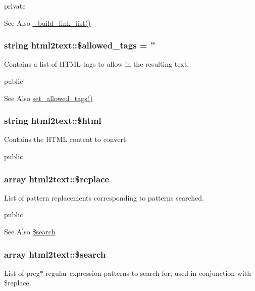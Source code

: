 private \begin{DoxySeeAlso}{See Also}
\hyperlink{classhtml2text_a82ac6258106b2d8ad380dce11d9dddef}{\-\_\-build\-\_\-link\-\_\-list()} 
\end{DoxySeeAlso}
\hypertarget{classhtml2text_a062ee8ef94be7191ef9dda3dba416891}{
\subsubsection[{\$allowed\-\_\-tags}]{\setlength{\rightskip}{0pt plus 5cm}string html2text\-::\$allowed\-\_\-tags = ''}}\label{classhtml2text_a062ee8ef94be7191ef9dda3dba416891}
Contains a list of H\-T\-M\-L tags to allow in the resulting text.

public \begin{DoxySeeAlso}{See Also}
\hyperlink{classhtml2text_a426f32b8fc504be6eb0e2af96d9e11f6}{set\-\_\-allowed\-\_\-tags()} 
\end{DoxySeeAlso}
\hypertarget{classhtml2text_a891f6ae7d8de6312895706453fcda29f}{
\subsubsection[{\$html}]{\setlength{\rightskip}{0pt plus 5cm}string html2text\-::\$html}}\label{classhtml2text_a891f6ae7d8de6312895706453fcda29f}
Contains the H\-T\-M\-L content to convert.

public \hypertarget{classhtml2text_ab84fb8261392ce0f0d329dbffd0dc848}{
\subsubsection[{\$replace}]{\setlength{\rightskip}{0pt plus 5cm}array html2text\-::\$replace}}\label{classhtml2text_ab84fb8261392ce0f0d329dbffd0dc848}
List of pattern replacements corresponding to patterns searched.

public \begin{DoxySeeAlso}{See Also}
\hyperlink{classhtml2text_aa5dbb9c672807ed8c4826b219aa2f22e}{\$search} 
\end{DoxySeeAlso}
\hypertarget{classhtml2text_aa5dbb9c672807ed8c4826b219aa2f22e}{
\subsubsection[{\$search}]{\setlength{\rightskip}{0pt plus 5cm}array html2text\-::\$search}}\label{classhtml2text_aa5dbb9c672807ed8c4826b219aa2f22e}
List of preg$\ast$ regular expression patterns to search for, used in conjunction with \$replace.

